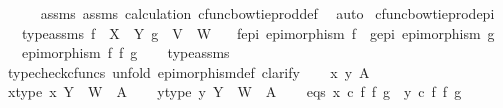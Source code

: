 \begin{isabellebody}
\ \ \ \ \isamarkupfalse%
\ assms{\isacharparenleft}{\kern0pt}{}{\isacharparenright}{\kern0pt}\ assms{\isacharparenleft}{\kern0pt}{}{\isacharparenright}{\kern0pt}\ calculation\ cfunc{\isacharunderscore}{\kern0pt}bowtie{\isacharunderscore}{\kern0pt}prod{\isacharunderscore}{\kern0pt}def{}\ \isamarkupfalse%
\ auto\isanewline
{}\isamarkupfalse%
%
\endisatagproof
{\isafoldproof}%
%
\isadelimproof
\isanewline
%
\endisadelimproof
\isanewline
{}\isamarkupfalse%
\ cfunc{\isacharunderscore}{\kern0pt}bowtieprod{\isacharunderscore}{\kern0pt}epi{\isacharcolon}{\kern0pt}\isanewline
\ \ \ type{\isacharunderscore}{\kern0pt}assms{\isacharcolon}{\kern0pt}\ {\isachardoublequoteopen}f\ {\isacharcolon}{\kern0pt}\ X\ {\isasymrightarrow}\ Y{\isachardoublequoteclose}\ {\isachardoublequoteopen}g\ {\isacharcolon}{\kern0pt}\ V\ {\isasymrightarrow}\ W{\isachardoublequoteclose}\isanewline
\ \ \ f{\isacharunderscore}{\kern0pt}epi{\isacharcolon}{\kern0pt}\ {\isachardoublequoteopen}epimorphism\ f{\isachardoublequoteclose}\ \ g{\isacharunderscore}{\kern0pt}epi{\isacharcolon}{\kern0pt}\ {\isachardoublequoteopen}epimorphism\ g{\isachardoublequoteclose}\isanewline
\ \ \ {\isachardoublequoteopen}epimorphism\ {\isacharparenleft}{\kern0pt}f\ {\isasymbowtie}\isactrlsub f\ g{\isacharparenright}{\kern0pt}{\isachardoublequoteclose}\isanewline
%
\isadelimproof
\ \ %
\endisadelimproof
%
\isatagproof
{}\isamarkupfalse%
\ type{\isacharunderscore}{\kern0pt}assms\isanewline
{}\isamarkupfalse%
\ {\isacharparenleft}{\kern0pt}typecheck{\isacharunderscore}{\kern0pt}cfuncs{\isacharcomma}{\kern0pt}\ unfold\ epimorphism{\isacharunderscore}{\kern0pt}def{}{\isacharcomma}{\kern0pt}\ clarify{\isacharparenright}{\kern0pt}\isanewline
\ \ \isamarkupfalse%
\ x\ y\ A\isanewline
\ \ \isamarkupfalse%
\ x{\isacharunderscore}{\kern0pt}type{\isacharcolon}{\kern0pt}\ {\isachardoublequoteopen}x{\isacharcolon}{\kern0pt}\ Y\ {\isasymCoprod}\ W\ {\isasymrightarrow}\ A{\isachardoublequoteclose}\isanewline
\ \ \isamarkupfalse%
\ y{\isacharunderscore}{\kern0pt}type{\isacharcolon}{\kern0pt}\ {\isachardoublequoteopen}y{\isacharcolon}{\kern0pt}\ Y\ {\isasymCoprod}\ W\ {\isasymrightarrow}\ A{\isachardoublequoteclose}\isanewline
\ \ \isamarkupfalse%
\ eqs{\isacharcolon}{\kern0pt}\ {\isachardoublequoteopen}x\ {\isasymcirc}\isactrlsub c\ f\ {\isasymbowtie}\isactrlsub f\ g\ {\isacharequal}{\kern0pt}\ y\ {\isasymcirc}\isactrlsub c\ f\ {\isasymbowtie}\isactrlsub f\ g{\isachardoublequoteclose}\isanewline

\end{isabellebody}
